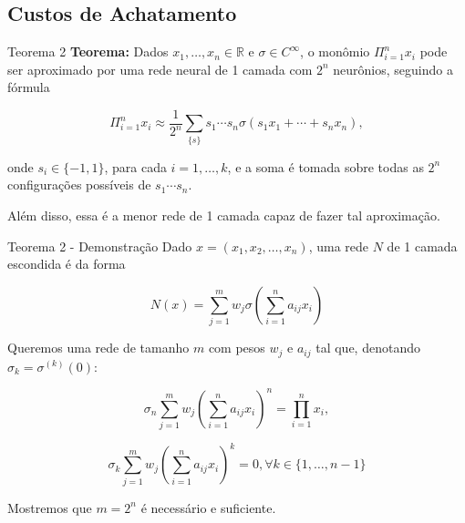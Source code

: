 \documentclass{beamer}
\begin{document}
\subsection{Custos de Achatamento}
\begin{frame}
    \tableofcontents[currentsection]
\end{frame}

\begin{frame}{Teorema 2}
    \textbf{Teorema:} Dados $x_1,\dots,x_n \in \mathbb R$ e $\sigma \in C^\infty$, o monômio $\Pi_{i=1}^n x_i$ pode ser aproximado por uma rede neural de 1 camada com $2^n$ neurônios, seguindo a fórmula

    \[
        \Pi_{i=1}^n x_i \approx \frac{1}{2^n} \sum_{\{s\}}s_1 \cdots s_n \sigma(s_1 x_1 + \cdots + s_n x_n),
    \]

    onde $s_i \in \{-1,1\}$, para cada $i = 1,\dots,k$, e a soma é tomada sobre todas as $2^n$ configurações possíveis de $s_1 \cdots s_n$.

    \pause

    Além disso, essa é a menor rede de 1 camada capaz de fazer tal aproximação.

\end{frame}

\begin{frame}{Teorema 2 - Demonstração}
    \small
    Dado $x = (x_1,x_2, \dots, x_n)$, uma rede $N$ de 1 camada escondida é da forma

    \[
        N(x) = \sum_{j=1}^m w_j \sigma \left(\sum_{i=1}^n a_{ij} x_i \right)
    \]

    \pause

    Queremos uma rede de tamanho $m$ com pesos $w_j$ e $a_{ij}$ tal que, denotando $\sigma_k = \sigma^(k)(0)$:
    
    \begin{equation} 
        \sigma_n \sum_{j=1}^{m} w_j \left( \sum_{i=1}^{n} a_{ij} x_i \right)^{n} = \prod_{i=1}^{n} x_i,
    \end{equation}
    
    \begin{equation}
        \sigma_k \sum_{j=1}^{m} w_j \left( \sum_{i=1}^{n} a_{ij} x_i \right)^{k} = 0, \forall k \in \{1, \dots, n-1\}
    \end{equation}

    \pause

    Mostremos que $m=2^n$ é necessário e suficiente.

\end{frame}
\end{document}
